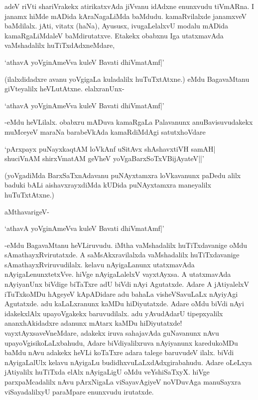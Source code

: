 adeV riVti shariVrakekx atirikatxvAda jiVvanu idAdxne enunxvudu tiVmARna. I janamx hiMde mADida kAraNagaLiMda baMdudu. kamaRvilalxde janamxveV baMdilalx. jAti, vitatx (haNa), Ayususx, ivugaLelalxvU modalu mADida kamaRgaLiMdaleV baMdirutatxve. Etakekx obabxnu Iga utatxmavAda vaMshadalilx huTiTxdAdxneMdare,

\begin{shloka}
`athavA yoVginAmeVva kuleV Bavati dhiVmatAmf|'
\end{shloka}

(ilalxdidadxre avanu yoVgigaLa kuladalilx huTuTxtAtxne.) eMdu BagavaMtanu giVteyalilx heVLutAtxne. elalxranUnx-

\begin{shloka}
`athavA yoVginAmeVva kuleV Bavati dhiVmatAmf|'
\end{shloka}

-eMdu heVLilalx. obabxru mADuva kamaRgaLa Palavanunx anuBavisuvudakekx muMceyeV maraNa barabeVkAda kamaRdiMdAgi satutxhoVdare

\begin{shloka}
`pArxpayx puNayxkaqtAM loVkAnf uSitAvx shAshavxtiVH samAH|\\
shuciVnAM shirxVmatAM geVheV yoVgaBarxSoTxV\s BijAyateV||' 
\end{shloka}

(yoVgadiMda BarxSaTxnAdavanu puNAyxtamxra loVkavanunx paDedu alilx baduki bALi aishavxrayxdiMda kUDida puNAyxtamxra maneyalilx huTuTxtAtxne.)

aMthavarigeV-

\begin{shloka}
`athavA yoVginAmeVva kuleV Bavati dhiVmatAmf|'
\end{shloka}

-eMdu BagavaMtanu heVLiruvudu. iMtha vaMshadalilx huTiTxdavanige oMdu sAmathayxRvirutatxde. A saMsAkxravilalxda vaMshadalilx huTiTxdavanige sAmathayxRviruvudilalx. kelavu nAyigaLanunx utatxmavAda nAyigaLenunxtetxVve. hiVge nAyigaLalelxV vayxtAyxsa. A utatxmavAda nAyiyanUnx biVdige biTaTxre adU biVdi nAyi Agutatxde. Adare A jAtiyalelxV iTuTxkoMDu hAgeyeV kApADidare adu bahaLa visheVSavuLaLx nAyiyAgi Agutatxde. adu kaLaLxranunx kaMDu hiDiyutatxde. Adare oMdu biVdi nAyi idakekxlAlx upayoVgakekx baruvudilalx. adu yAvudAdarU tipepxyalilx ananxhAkidadxre adanunx mAtarx kaMDu hiDiyutatxde! vayxtAyxsaveVneMdare, adakekx iruva sahajavAda guNavanunx nAvu upayoVgisikoLaLxbahudu, Adare biVdiyalilxruva nAyiyanunx karedukoMDu baMdu nAvu adakekx heVLi koTaTxre adara talege baruvudeV ilalx. biVdi nAyigaLalUlx kelavu nAyigaLu budidhxvuLaLxdAdxgirabahudu. Adare oLeLxya jAtiyalilx huTiTxda elAlx nAyigaLigU oMdu veYshiSaTxyX. hiVge parxpaMcadalilx nAvu pArxNigaLa viSayavAgiyeV noVDuvAga manuSayxra viSayadalilxyU paraMpare enunxvudu irutatxde.

